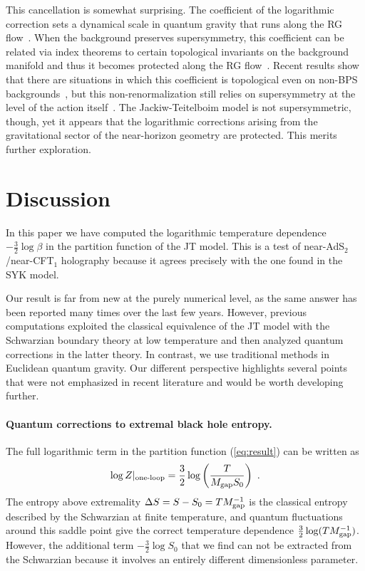 \documentclass[12pt]{article}
\begin{document}
This cancellation is somewhat surprising.  The coefficient of the logarithmic correction sets a dynamical scale in quantum gravity that runs along the RG flow~\cite{PERRY1978114,Tong:2014era,Charles:2017dbr}.  When the background preserves supersymmetry, this coefficient can be related via index theorems to certain topological invariants on the background manifold and thus it becomes protected along the RG flow~\cite{Christensen:1978md,Vassilevich:2003xt,Banerjee:2010qc,Sen:2014aja}.  Recent results show that there are situations in which this coefficient is topological even on non-BPS backgrounds~\cite{Charles:2015eha,Castro:2018hsc}, but this non-renormalization still relies on supersymmetry at the level of the action itself~\cite{Charles:2017dbr}.  The Jackiw-Teitelboim model is not supersymmetric, though, yet it appears that the logarithmic corrections arising from the gravitational sector of the near-horizon geometry are protected. This merits further exploration.

\section{Discussion}
\label{sec:conc}

In this paper we have computed the logarithmic temperature dependence $-\frac{3}{2}\log \beta$ in the partition function of the JT model. 
This is a test of near-AdS$_2$/near-CFT$_1$ holography because it agrees precisely with the one found in the SYK model. 

Our result is far from new at the purely numerical level, as the same answer has been reported many times over the last few years. However, previous computations exploited the classical equivalence of the JT model with the Schwarzian boundary theory at low temperature and then analyzed quantum corrections in the latter theory. In contrast, we use traditional methods in Euclidean quantum gravity. Our different perspective highlights several points that were not emphasized in recent literature and would be worth developing further.


\paragraph{Quantum corrections to extremal black hole entropy.}

The full logarithmic term in the partition function (\ref{eq:result}) can be written as
$$
\log Z |_{\text{one-loop}} = \frac{3}{2}\log\left( \frac{T}{M_{\rm gap} S_0}\right)~. 
$$
The entropy above extremality $\Delta S = S-S_0 = TM^{-1}_{\rm gap}$ is the classical entropy described by the Schwarzian at finite temperature, and quantum fluctuations around this saddle point give the correct temperature dependence $\frac{3}{2}\log (TM^{-1}_{\rm gap})$. However, the additional term $-\frac{3}{2}\log S_0$ that we find can not be extracted from the Schwarzian because it involves an entirely different dimensionless parameter. 
\end{document}
